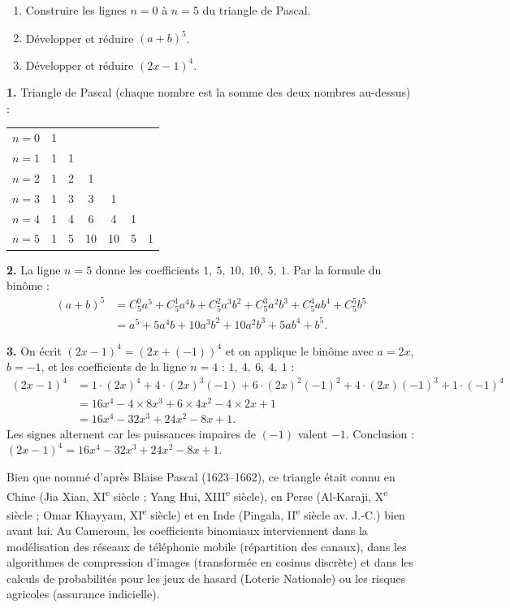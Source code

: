 \documentclass[11pt]{article}
\begin{document}
\begin{exoresolu}
\begin{enumerate}
\item Construire les lignes $n=0$ à $n=5$ du triangle de Pascal.
\item Développer et réduire $(a+b)^5$.
\item Développer et réduire $(2x-1)^4$.
\end{enumerate}
\tcblower
\textbf{1.} Triangle de Pascal (chaque nombre est la somme des deux nombres au-dessus) :
\begin{center}
\begin{tabular}{c|cccccc}
$n=0$ & 1 & & & & & \\
$n=1$ & 1 & 1 & & & & \\
$n=2$ & 1 & 2 & 1 & & & \\
$n=3$ & 1 & 3 & 3 & 1 & & \\
$n=4$ & 1 & 4 & 6 & 4 & 1 & \\
$n=5$ & 1 & 5 & 10 & 10 & 5 & 1 \\
\end{tabular}
\end{center}

\textbf{2.} La ligne $n=5$ donne les coefficients $1,\ 5,\ 10,\ 10,\ 5,\ 1$. Par la formule du binôme :
\begin{align*}
(a+b)^5 &= C_5^0 a^5 + C_5^1 a^4 b + C_5^2 a^3 b^2 + C_5^3 a^2 b^3 + C_5^4 a b^4 + C_5^5 b^5 \\
&= a^5+5a^4b+10a^3b^2+10a^2b^3+5ab^4+b^5.
\end{align*}

\textbf{3.} On écrit $(2x-1)^4=(2x+(-1))^4$ et on applique le binôme avec $a=2x$, $b=-1$, et les coefficients de la ligne $n=4$ : $1,\ 4,\ 6,\ 4,\ 1$ :
\begin{align*}
(2x-1)^4 &= 1\cdot(2x)^4+4\cdot(2x)^3(-1)+6\cdot(2x)^2(-1)^2+4\cdot(2x)(-1)^3+1\cdot(-1)^4 \\
&= 16x^4-4\times 8x^3+6\times 4x^2-4\times 2x+1 \\
&= 16x^4-32x^3+24x^2-8x+1.
\end{align*}
Les signes alternent car les puissances impaires de $(-1)$ valent $-1$. Conclusion : $(2x-1)^4=16x^4-32x^3+24x^2-8x+1$.
\end{exoresolu}

\begin{savaistu}
Bien que nommé d'après Blaise Pascal (1623--1662), ce triangle était connu en Chine (Jia Xian, XI\textsuperscript{e} siècle ; Yang Hui, XIII\textsuperscript{e} siècle), en Perse (Al-Karaji, X\textsuperscript{e} siècle ; Omar Khayyam, XI\textsuperscript{e} siècle) et en Inde (Pingala, II\textsuperscript{e} siècle av. J.-C.) bien avant lui. Au Cameroun, les coefficients binomiaux interviennent dans la modélisation des réseaux de téléphonie mobile (répartition des canaux), dans les algorithmes de compression d'images (transformée en cosinus discrète) et dans les calculs de probabilités pour les jeux de hasard (Loterie Nationale) ou les risques agricoles (assurance indicielle).
\end{savaistu}
\end{document}
